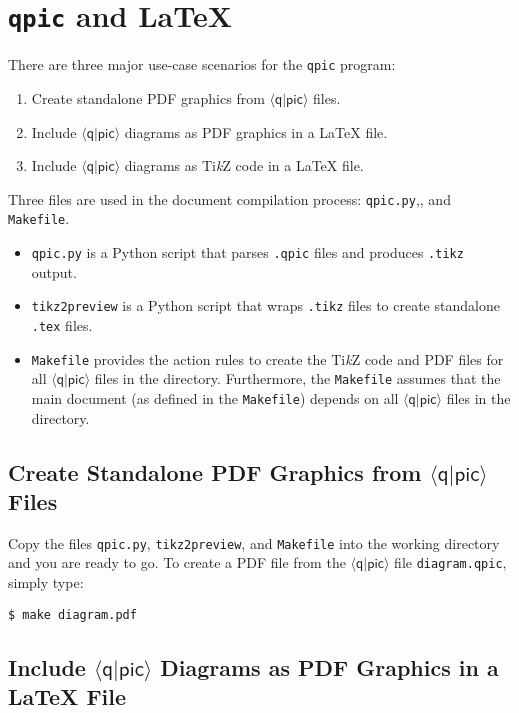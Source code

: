 \documentclass[twoside,12pt]{article}
\newcommand{\qpic}{$\langle\mathsf{q}|\mathsf{pic}\rangle$\xspace}
\newcommand{\qpicpy}{{\tt qpic}\xspace}
\newcommand{\TikZ}{Ti\emph{k}Z\xspace}
\begin{document}
\section{\qpicpy and \LaTeX}
\label{sec-tools}

There are three major use-case scenarios for the \qpicpy program:
\begin{enumerate}
\item Create standalone PDF graphics from \qpic files.
\item Include \qpic diagrams as PDF graphics in a {\LaTeX} file.
\item Include \qpic diagrams as \TikZ code in a {\LaTeX} file.
\end{enumerate}

\noindent
Three files are used in the document compilation process: {\tt qpic.py},, and {\tt Makefile}.

\begin{itemize}
\item {\tt qpic.py} is a Python script that parses {\tt .qpic} files and produces {\tt .tikz} output.
\item {\tt tikz2preview} is a Python script that wraps {\tt .tikz} files to create stand\-alone {\tt .tex} files.
\item {\tt Makefile} provides the action rules to create the \TikZ code and PDF files for all \qpic files in the directory. Furthermore, the {\tt Makefile} assumes that the main document (as defined in the {\tt Makefile}) depends on all \qpic files in the directory.
\end{itemize}

\subsection{Create Standalone PDF Graphics from \qpic Files}

Copy the files {\tt qpic.py}, {\tt tikz2preview}, and {\tt Makefile} into the working directory and you are ready to go. To create a PDF file from the \qpic file {\tt diagram.qpic}, simply type:

\begin{minipage}{5in}
\begin{lstlisting}[basicstyle=\normalsize\ttfamily,numbers=none]
$ make diagram.pdf
\end{lstlisting}
\end{minipage}%


\subsection{Include \qpic Diagrams as PDF Graphics in a {\LaTeX} File}
\end{document}
